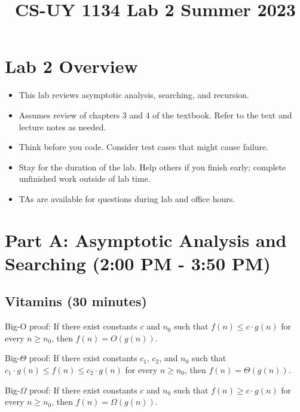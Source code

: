 \documentclass{article}
\begin{document}
\title{CS-UY 1134 Lab 2 Summer 2023}
\date{}
\maketitle

\section*{Lab 2 Overview}

\begin{itemize}
    \item This lab reviews asymptotic analysis, searching, and recursion.
    \item Assumes review of chapters 3 and 4 of the textbook.  Refer to the text and lecture notes as needed.
    \item Think before you code. Consider test cases that might cause failure.
    \item Stay for the duration of the lab. Help others if you finish early; complete unfinished work outside of lab time.
    \item TAs are available for questions during lab and office hours.
\end{itemize}

\section*{Part A: Asymptotic Analysis and Searching (2:00 PM - 3:50 PM)}

\subsection*{Vitamins (30 minutes)}

Big-O proof: If there exist constants $c$ and $n_0$ such that $f(n) \le c \cdot g(n)$ for every $n \ge n_0$, then $f(n) = O(g(n))$.

Big-$\Theta$ proof: If there exist constants $c_1$, $c_2$, and $n_0$ such that $c_1 \cdot g(n) \le f(n) \le c_2 \cdot g(n)$ for every $n \ge n_0$, then $f(n) = \Theta(g(n))$.

Big-$\Omega$ proof: If there exist constants $c$ and $n_0$ such that $f(n) \ge c \cdot g(n)$ for every $n \ge n_0$, then $f(n) = \Omega(g(n))$.
\end{document}
